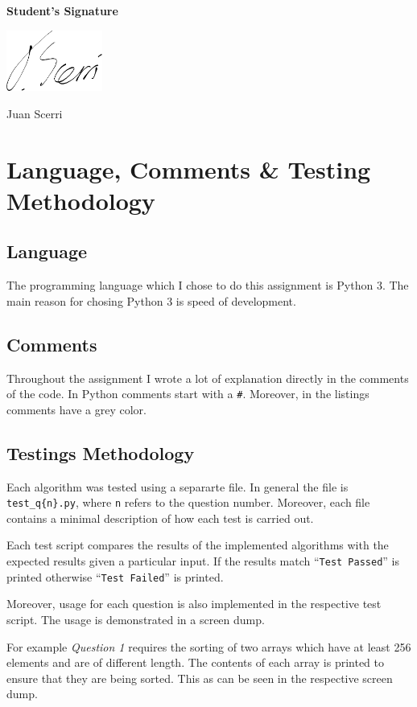 \documentclass[12pt]{article}
\begin{document}
\textbf{Student's Signature} \medskip

\underline{\includegraphics[height=2cm]{sig}} \medskip

Juan Scerri

\section{Language, Comments \& Testing Methodology}

\subsection{Language}

The programming language which I chose to do this assignment is
Python 3. The main reason for chosing Python 3 is speed of
development.

\subsection{Comments}

Throughout the assignment I wrote a lot of explanation directly in
the comments of the code. In Python comments start with a
\texttt{\#}. Moreover, in the listings comments have a grey
color.

\subsection{Testings Methodology}

Each algorithm was tested using a separarte file. In general the
file is \texttt{test\_q\{n\}.py}, where \texttt{n} refers to the
question number. Moreover, each file contains a minimal
description of how each test is carried out.

Each test script compares the results of the implemented
algorithms with the expected results given a particular input.
If the results match ``\texttt{Test Passed}'' is printed
otherwise ``\texttt{Test Failed}'' is printed. 

Moreover, usage for each question is also implemented in the
respective test script. The usage is demonstrated in a screen
dump.

For example \textit{Question 1} requires the sorting of two
arrays which have at least 256 elements and are of different
length. The contents of each array is printed to ensure that
they are being sorted. This as can be seen in the respective
screen dump.
\end{document}

